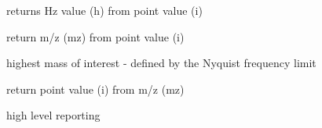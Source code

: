 \documentclass[letterpaper,10pt,openany,oneside]{sphinxmanual}
\begin{document}
\begin{fulllineitems}
\begin{fulllineitems}
\end{fulllineitems}


\begin{fulllineitems}
\label{rst/code:Orbitrap.OrbiAxis.itoh}
returns Hz value (h) from point value (i)

\end{fulllineitems}


\begin{fulllineitems}
\label{rst/code:Orbitrap.OrbiAxis.itomz}
return m/z (mz) from point value (i)

\end{fulllineitems}


\begin{fulllineitems}
\label{rst/code:Orbitrap.OrbiAxis.lowmass}
highest mass of interest - defined by the Nyquist frequency limit

\end{fulllineitems}


\begin{fulllineitems}
\label{rst/code:Orbitrap.OrbiAxis.mztoi}
return point value (i) from  m/z (mz)

\end{fulllineitems}


\begin{fulllineitems}
\label{rst/code:Orbitrap.OrbiAxis.report}
high level reporting

\end{fulllineitems}


\end{fulllineitems}

\end{document}
